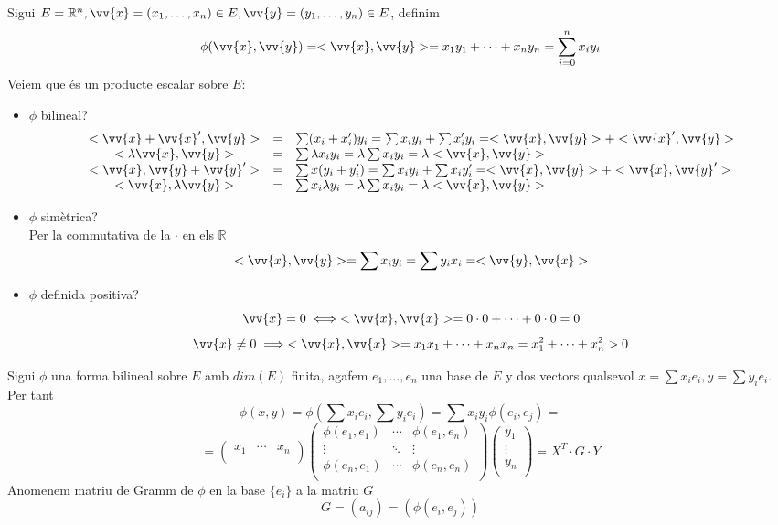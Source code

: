 \begin{exmp}
	Sigui $E=\mathbb{R}^n,\vv{x}=(x_1,\dotsc,x_n)\in E,\vv{y}=(y_1,\dotsc,y_n)\in E$, definim
	\[\phi(\vv{x},\vv{y})=<\vv{x},\vv{y}>=x_1y_1+\dotsb+x_ny_n=\sum\limits_{i=0}^nx_iy_i\]
	Veiem que és un producte escalar sobre $E$:
	\begin{itemize}
		\item $\phi$ bilineal?
		\[\begin{array}{ccl}
			<\vv{x}+\vv{x}',\vv{y}>&=&\sum(x_i+x_i')y_i=\sum x_iy_i+\sum x_i'y_i=<\vv{x},\vv{y}>+<\vv{x}',\vv{y}>\\
			<\lambda\vv{x},\vv{y}>&=&\sum\lambda x_iy_i=\lambda\sum x_iy_i=\lambda<\vv{x},\vv{y}>\\
			<\vv{x},\vv{y}+\vv{y}'>&=&\sum x(y_i+y_i')=\sum x_iy_i+\sum x_iy_i'=<\vv{x},\vv{y}>+<\vv{x},\vv{y}'>\\
			<\vv{x},\lambda\vv{y}>&=&\sum x_i\lambda y_i=\lambda\sum x_iy_i=\lambda<\vv{x},\vv{y}>\\
		\end{array}\]
		\item $\phi$ simètrica? \\
		Per la commutativa de la $\cdot$ en els $\mathbb{R}$
		\[<\vv{x},\vv{y}>=\sum x_iy_i=\sum y_ix_i=<\vv{y},\vv{x}>\]
		\item $\phi$ definida positiva?
		\[\vv{x}=0\iff<\vv{x},\vv{x}>=0\cdot 0+\dotsb+0\cdot 0=0\]
		\[\vv{x}\neq 0\implies<\vv{x},\vv{x}>=x_1x_1+\dotsb+x_nx_n=x_1^2+\dotsb+x_n^2>0\]
	\end{itemize}
\end{exmp}

\begin{defn}
	Sigui $\phi$ una forma bilineal sobre $E$ amb $dim(E)$ finita, agafem $e_1,\dotsc,e_n$ una base de $E$ y dos vectors qualsevol $x=\sum x_ie_i,y=\sum y_ie_i$. Per tant
	\[\phi(x,y)=\phi(\sum x_ie_i,\sum y_ie_i)=\sum x_iy_i\phi(e_i,e_j)=\]
	\[=\left(\begin{array}{ccc}x_1&\cdots&x_n\\\end{array}\right)\left(\begin{array}{ccc}
		\phi(e_1,e_1)&\cdots&\phi(e_1,e_n)\\
		\vdots&\ddots&\vdots\\
		\phi(e_n,e_1)&\cdots&\phi(e_n,e_n)\\	
	\end{array}\right)\left(\begin{array}{c}y_1 \\\vdots\\y_n\\\end{array}\right)=X^T\cdot G\cdot Y\]
	Anomenem matriu de Gramm de $\phi$ en la base $\{e_i\}$ a la matriu $G$
	\[G=(a_{ij})=(\phi(e_i,e_j))\]
\end{defn}


